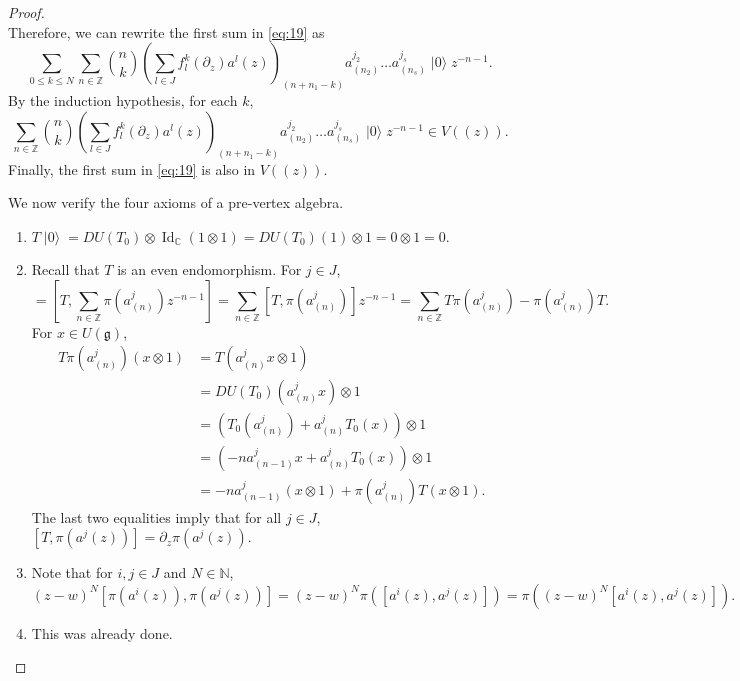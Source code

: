 \documentclass[a4paper, 12pt, reqno]{amsart}
\theoremstyle{remark}
\numberwithin{equation}{subsection}
\DeclareMathOperator{\Id}{Id}
\DeclareMathOperator{\vac}{|0\rangle}
\begin{document}
\begin{proof}
\begin{equation*}
  \end{equation*}
  Therefore, we can rewrite the first sum in \eqref{eq:19} as
  \begin{equation*}
    \sum_{0 \le k \le N}\sum_{n \in \mathbb{Z}}\binom{n}{k}\left(\sum_{l \in J}f^k_l(\partial_z)a^l(z)\right)_{(n + n_1 - k)}a^{j_2}_{(n_2)}\dots a^{j_s}_{(n_s)}\vac z^{-n - 1}.
  \end{equation*}
  By the induction hypothesis, for each $k$,
  \begin{equation*}
    \sum_{n \in \mathbb{Z}}\binom{n}{k}\left(\sum_{l \in J}f^k_l(\partial_z)a^l(z)\right)_{(n + n_1 - k)}a^{j_2}_{(n_2)}\dots a^{j_s}_{(n_s)}\vac z^{-n - 1} \in V((z)).
  \end{equation*}
  Finally, the first sum in \eqref{eq:19} is also in $V((z))$.

  We now verify the four axioms of a pre-vertex algebra.
  \begin{enumerate}
  \item $T\vac = DU(T_0)\otimes \Id_{\mathbb{C}}(1\otimes1) = DU(T_0)(1)\otimes1 = 0\otimes1 = 0$.
  \item Recall that $T$ is an even endomorphism.
    For $j \in J$,
    \begin{equation*}
      [T, \pi(a^j(z))] = \left[T, \sum_{n \in \mathbb{Z}}\pi(a^j_{(n)})z^{-n - 1}\right] = \sum_{n \in \mathbb{Z}}[T, \pi(a^j_{(n)})]z^{-n - 1} = \sum_{n \in \mathbb{Z}}T\pi(a^j_{(n)}) - \pi(a^j_{(n)})T.
    \end{equation*}
    For $x \in U(\mathfrak{g})$,
    \begin{align*}
      T\pi(a^j_{(n)})(x\otimes1) &= T(a^j_{(n)}x\otimes1) \\
      &= DU(T_0)(a^j_{(n)}x)\otimes1 \\
      &= (T_0(a^j_{(n)}) + a^j_{(n)}T_0(x))\otimes1 \\
      &= (-na^j_{(n - 1)}x + a^j_{(n)}T_0(x))\otimes1 \\
      &= -na^j_{(n - 1)}(x\otimes1) + \pi(a^j_{(n)})T(x\otimes 1).
    \end{align*}
    The last two equalities imply that for all $j \in J$, $[T, \pi(a^j(z))] = \partial_z\pi(a^j(z))$.
  \item Note that for $i, j \in J$ and $N \in \mathbb{N}$,
    \begin{equation*}
      (z - w)^N[\pi(a^i(z)), \pi(a^j(z))] = (z - w)^N\pi([a^i(z), a^j(z)]) = \pi((z - w)^N[a^i(z), a^j(z)]).
    \end{equation*}
  \item This was already done. \qedhere
  \end{enumerate}
\end{proof}
\end{document}
